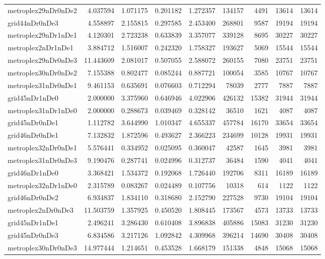 \documentclass[../../../thesis.tex]{subfiles}
\begin{document}
\begin{longtable}{|l|r|r|r|r|r|r|r|r|}
metroplex29nDr0nDe2 & 4.037594 & 1.071175 & 0.201182 & 1.272357 & 134157 & 4491 & 13614 & 13614 \\
grid44nDr0nDe3 & 4.558897 & 2.155815 & 0.297585 & 2.453400 & 268801 & 9587 & 19194 & 19194 \\
metroplex29nDr1nDe1 & 4.120301 & 2.723238 & 0.633839 & 3.357077 & 339128 & 8695 & 30227 & 30227 \\
metroplex2nDr1nDe1 & 3.884712 & 1.516007 & 0.242320 & 1.758327 & 193627 & 5069 & 15544 & 15544 \\
metroplex29nDr0nDe3 & 11.443609 & 2.081017 & 0.507055 & 2.588072 & 260155 & 7080 & 23751 & 23751 \\
metroplex30nDr0nDe2 & 7.155388 & 0.802477 & 0.085244 & 0.887721 & 100054 & 3585 & 10767 & 10767 \\
metroplex31nDr0nDe1 & 9.461153 & 0.635691 & 0.076603 & 0.712294 & 78039 & 2777 & 7887 & 7887 \\
grid45nDr1nDe0 & 2.000000 & 3.375960 & 0.646946 & 4.022906 & 426132 & 15382 & 31944 & 31944 \\
metroplex31nDr1nDe0 & 2.000000 & 0.288673 & 0.039469 & 0.328142 & 36510 & 1621 & 4087 & 4087 \\
grid45nDr0nDe1 & 1.112782 & 3.644990 & 1.010347 & 4.655337 & 457784 & 16170 & 33654 & 33654 \\
grid46nDr0nDe1 & 7.132832 & 1.872596 & 0.493627 & 2.366223 & 234699 & 10128 & 19931 & 19931 \\
metroplex32nDr0nDe1 & 5.576441 & 0.334952 & 0.025095 & 0.360047 & 42587 & 1645 & 3981 & 3981 \\
metroplex31nDr0nDe3 & 9.190476 & 0.287741 & 0.024996 & 0.312737 & 36484 & 1590 & 4041 & 4041 \\
grid46nDr1nDe0 & 3.368421 & 1.534372 & 0.192068 & 1.726440 & 192706 & 8311 & 16189 & 16189 \\
metroplex32nDr1nDe0 & 2.315789 & 0.083267 & 0.024489 & 0.107756 & 10318 & 614 & 1122 & 1122 \\
grid46nDr0nDe2 & 6.934837 & 1.834110 & 0.318680 & 2.152790 & 227528 & 9730 & 19104 & 19104 \\
metroplex2nDr0nDe3 & 11.503759 & 1.357925 & 0.450520 & 1.808445 & 173567 & 4573 & 13733 & 13733 \\
grid45nDr1nDe1 & 2.496241 & 3.286430 & 0.610408 & 3.896838 & 405886 & 15083 & 31230 & 31230 \\
grid45nDr0nDe3 & 6.834586 & 3.217126 & 1.092842 & 4.309968 & 396214 & 14690 & 30408 & 30408 \\
metroplex30nDr0nDe3 & 14.977444 & 1.214651 & 0.453528 & 1.668179 & 151338 & 4848 & 15068 & 15068 \\

\end{longtable}
\end{document}
